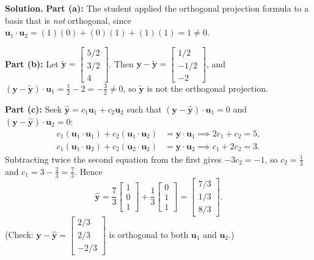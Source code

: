 \documentclass[11pt, letterpaper]{article}
\theoremstyle{definition}
\theoremstyle{remark}
\begin{document}
\textbf{Solution.}
\textbf{Part (a):} The student applied the orthogonal projection formula to a basis that is \emph{not} orthogonal, since $\mathbf{u}_1 \cdot \mathbf{u}_2 = (1)(0) + (0)(1) + (1)(1) = 1 \neq 0$.

\textbf{Part (b):} Let $\tilde{\mathbf{y}} = \begin{bmatrix} 5/2 \\ 3/2 \\ 4 \end{bmatrix}$. Then $\mathbf{y} - \tilde{\mathbf{y}} = \begin{bmatrix} 1/2 \\ -1/2 \\ -2 \end{bmatrix}$, and $(\mathbf{y} - \tilde{\mathbf{y}}) \cdot \mathbf{u}_1 = \frac{1}{2} - 2 = -\frac{3}{2} \neq 0$, so $\tilde{\mathbf{y}}$ is not the orthogonal projection.

\textbf{Part (c):} Seek $\hat{\mathbf{y}} = c_1 \mathbf{u}_1 + c_2 \mathbf{u}_2$ such that $(\mathbf{y} - \hat{\mathbf{y}})\cdot\mathbf{u}_1 = 0$ and $(\mathbf{y} - \hat{\mathbf{y}})\cdot\mathbf{u}_2 = 0$:
\begin{align*}
c_1(\mathbf{u}_1\cdot\mathbf{u}_1) + c_2(\mathbf{u}_1\cdot\mathbf{u}_2) &= \mathbf{y}\cdot\mathbf{u}_1 \implies 2c_1 + c_2 = 5, \\
c_1(\mathbf{u}_1\cdot\mathbf{u}_2) + c_2(\mathbf{u}_2\cdot\mathbf{u}_2) &= \mathbf{y}\cdot\mathbf{u}_2 \implies c_1 + 2c_2 = 3.
\end{align*}
Subtracting twice the second equation from the first gives $-3c_2 = -1$, so $c_2 = \frac{1}{3}$ and $c_1 = 3 - \frac{2}{3} = \frac{7}{3}$. Hence
\[
\hat{\mathbf{y}} = \frac{7}{3}\begin{bmatrix} 1 \\ 0 \\ 1 \end{bmatrix} + \frac{1}{3}\begin{bmatrix} 0 \\ 1 \\ 1 \end{bmatrix} = \begin{bmatrix} 7/3 \\ 1/3 \\ 8/3 \end{bmatrix}.
\]
(Check: $\mathbf{y} - \hat{\mathbf{y}} = \begin{bmatrix} 2/3 \\ 2/3 \\ -2/3 \end{bmatrix}$ is orthogonal to both $\mathbf{u}_1$ and $\mathbf{u}_2$.)
\end{document}

